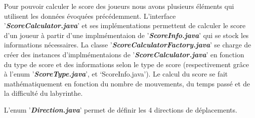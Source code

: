 Pour pouvoir calculer le score des joueurs nous avons plusieurs éléments qui
utilisent les données évoquées précédemment. L'interface '\textbf{\textit{ScoreCalculator.java}}'
et ses implémentations permettent de calculer le score d'un joueur à partir
d'une implmémentaion de '\textbf{\textit{ScoreInfo.java}}' qui se stock les informations
nécessaires. La classe '\textbf{\textit{ScoreCalculatorFactory.java}}' se charge de créer des
instances d'implmémentaions de '\textbf{\textit{ScoreCalculator.java}}' en fonction du type de
score et des informations selon le type de score (respectivement grâce à l'enum
'\textbf{\textit{ScoreType.java}}', et `ScoreInfo.java'). Le calcul du score se fait
mathématiquement en fonction du nombre de mouvements, du temps passé et de la
difficulté du labyrinthe.

L'enum  '\textbf{\textit{Direction.java}}' permet de définir les 4 directions de déplacements.
